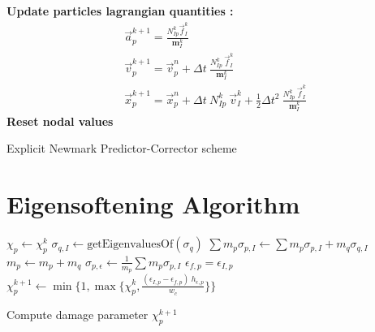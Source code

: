 \documentclass[preprint,12pt,a4paper]{elsarticle}
\newcommand{\tens}[1]{
  \ensuremath{\mathbf{{#1}}}
}
\begin{document}
\begin{algorithm}[H]
    \textbf{Update particles lagrangian quantities :}
    \begin{align*}
      &\vec{a}_p^{k+1} = \frac{N_{Ip}^k\vec{f}_{I}^{k}}{\tens{m}_I^k}\\
      &\vec{v}_p^{k+1} = \vec{v}_p^n + \Delta t\
        \frac{N_{Ip}^k\
        \vec{f}_{I}^{k}}{\tens{m}_I^k}\\
      &\vec{x}_p^{k+1} = \vec{x}_p^n + \Delta t\
         N_{Ip}^k\ \vec{v}_{I}^{k} +
        \frac{1}{2}\Delta t^2\ \frac{N_{Ip}^k\
        \vec{f}_{I}^{k}}{\tens{m}_I^k}
    \end{align*}\;
    \textbf{Reset nodal values}\;
    \label{alg-epc}
    \caption{Explicit Newmark Predictor-Corrector scheme}
\end{algorithm} 


\section{Eigensoftening Algorithm}
\label{sec:eigens-algor-1}

\begin{algorithm}[H]
  \DontPrintSemicolon
  $\chi_p \leftarrow \chi_p^{k}$ \;
  \For{$p$ to $N_p$}
  {
    {
      {
        $\sigma_{q,I} \leftarrow \text{getEigenvaluesOf}(\sigma_{q})$ \;
        {
          $\sum m_p\sigma_{p,I} \leftarrow \sum m_p\sigma_{p,I} + m_q\sigma_{q,I}$ \;
        }
        $m_p \leftarrow m_p + m_q$ \;
      }
      $\sigma_{p,\epsilon} \leftarrow \frac{1}{m_p} \sum m_p\sigma_{p,I}$\;
      {
        $\epsilon_{f,p} = \epsilon_{I,p}$ \;  
      }
      {
        $\chi_p^{k+1} \leftarrow \min\Big \{1 , \max \{\chi_p^{k},
        \frac{(\epsilon_{I,p}- \epsilon_{f,p})\ h_{\epsilon,p}}{w_c}
        \} \Big \}$ \;
      }
    }
  }
  \caption{Compute damage parameter $\chi_p^{k+1}$}
  \label{alg-eigens}
\end{algorithm}

 
\end{document}
